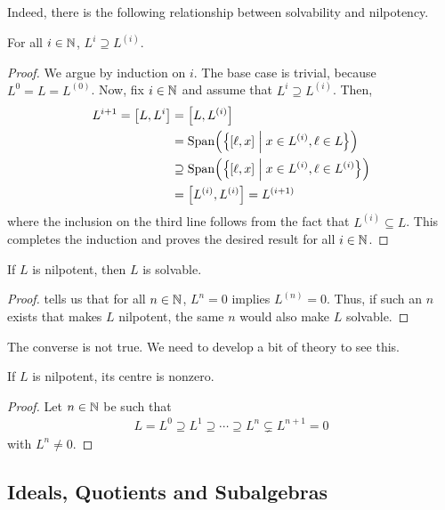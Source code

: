 Indeed, there is the following relationship between solvability and nilpotency.

\begin{boxlemma}\label{Ch1:Lemma:DerivedSeriesContainedInLowerCentralSeries}
    For all $i \in \mathbb{N}$, $L^i \supseteq L^{(i)}$.
\end{boxlemma}
\begin{proof}
    We argue by induction on $i$. The base case is trivial, because $L^0 = L = L^{(0)}$. Now, fix $i \in \mathbb{N}$ and assume that $L^i \supseteq L^{(i)}$. Then,
    \begin{align*}
        L^{i + 1}
        = \left[ L, L^i \right] &= \left[ L, L^{(i)} \right] \\
        &= \operatorname{Span}\!\left( \left\{ \left[ \ell, x \right] \; \middle\vert \; x \in L^{(i)}, \ell \in L \right\} \right) \\
        &\supseteq \operatorname{Span}\!\left( \left\{ \left[ \ell, x \right] \; \middle\vert \; x \in L^{(i)}, \ell \in L^{(i)} \right\} \right) \\
        &= \left[ L^{(i)}, L^{(i)} \right] = L^{(i + 1)}
    \end{align*}
    where the inclusion on the third line follows from the fact that $L^{(i)} \subseteq L$. This completes the induction and proves the desired result for all $i \in \mathbb{N}$.
\end{proof}

\begin{boxcorollary}
    If $L$ is nilpotent, then $L$ is solvable.
\end{boxcorollary}
\begin{proof}
     tells us that for all $n \in \mathbb{N}$, $L^n = 0$ implies $L^{(n)} = 0$. Thus, if such an $n$ exists that makes $L$ nilpotent, the same $n$ would also make $L$ solvable.
\end{proof}

The converse is not true. We need to develop a bit of theory to see this.

\begin{boxlemma}\label{Ch1:Lemma:NilpotentCentreNonzero}
    If $L$ is nilpotent, its centre is nonzero.
\end{boxlemma}
\begin{proof}
    Let $n \in \mathbb{N}$ be such that
    \begin{align*}
        L = L^0 \supseteq L^1 \supseteq \cdots \supseteq L^n \subsetneq L^{n+1} = 0
    \end{align*}
    with $L^n \neq 0$.
\end{proof}

\subsection{Ideals, Quotients and Subalgebras}

